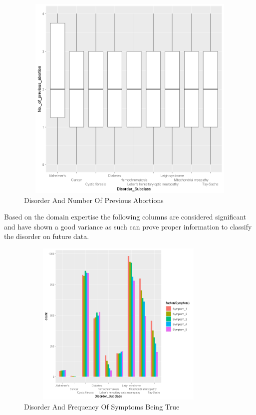 \begin{figure}[htpb]
	\centering
	\includegraphics[height=10cm, width=12cm]{figures/npa.png}
	\caption{Disorder And Number Of Previous Abortions}
	\label{fig 23}
\end{figure}
\newpage
 \noindent
Based on the domain expertise the following columns are considered significant and have shown a good variance as such can prove proper information to classify the disorder on future data.
\begin{figure}[htpb]
	\centering
	\includegraphics[height=8cm, width=10cm]{figures/s1.png}
	\caption{Disorder And Frequency Of Symptoms Being True}
	\label{fig 24}
\end{figure}
